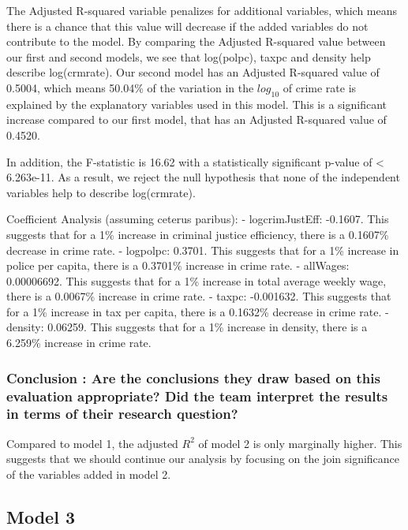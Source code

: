 \documentclass[]{article}
\begin{document}
The Adjusted R-squared variable penalizes for additional variables,
which means there is a chance that this value will decrease if the added
variables do not contribute to the model. By comparing the Adjusted
R-squared value between our first and second models, we see that
log(polpc), taxpc and density help describe log(crmrate). Our second
model has an Adjusted R-squared value of 0.5004, which means 50.04\% of
the variation in the \(log_{10}\) of crime rate is explained by the
explanatory variables used in this model. This is a significant increase
compared to our first model, that has an Adjusted R-squared value of
0.4520.

In addition, the F-statistic is 16.62 with a statistically significant
p-value of \textless{} 6.263e-11. As a result, we reject the null
hypothesis that none of the independent variables help to describe
log(crmrate).

Coefficient Analysis (assuming ceterus paribus): - logcrimJustEff:
-0.1607. This suggests that for a 1\% increase in criminal justice
efficiency, there is a 0.1607\% decrease in crime rate. - logpolpc:
0.3701. This suggests that for a 1\% increase in police per capita,
there is a 0.3701\% increase in crime rate. - allWages: 0.00006692. This
suggests that for a 1\% increase in total average weekly wage, there is
a 0.0067\% increase in crime rate. - taxpc: -0.001632. This suggests
that for a 1\% increase in tax per capita, there is a 0.1632\% decrease
in crime rate. - density: 0.06259. This suggests that for a 1\% increase
in density, there is a 6.259\% increase in crime rate.

\hypertarget{conclusion-are-the-conclusions-they-draw-based-on-this-evaluation-appropriate-did-the-team-interpret-the-results-in-terms-of-their-research-question}{%
\subsubsection{Conclusion : Are the conclusions they draw based on this
evaluation appropriate? Did the team interpret the results in terms of
their research
question?}\label{conclusion-are-the-conclusions-they-draw-based-on-this-evaluation-appropriate-did-the-team-interpret-the-results-in-terms-of-their-research-question}}

Compared to model 1, the adjusted \(R^2\) of model 2 is only marginally
higher. This suggests that we should continue our analysis by focusing
on the join significance of the variables added in model 2.

\hypertarget{model-3}{%
\subsection{Model 3}\label{model-3}}
\end{document}
